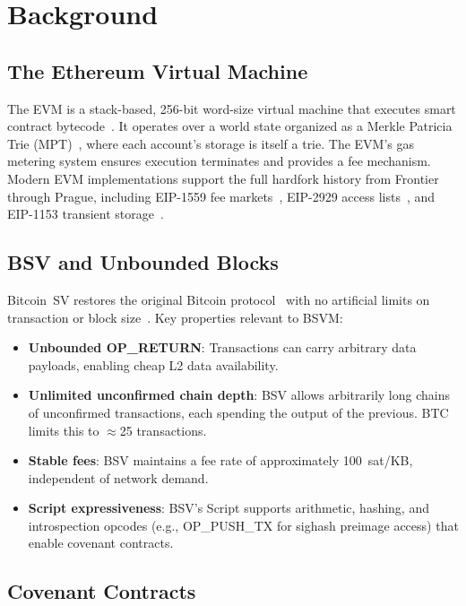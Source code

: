 \documentclass[11pt,twocolumn]{article}
\begin{document}
\section{Background}
\label{sec:background}

\subsection{The Ethereum Virtual Machine}

The EVM is a stack-based, 256-bit word-size virtual machine that executes smart contract bytecode~\cite{wood_ethereum}. It operates over a world state organized as a Merkle Patricia Trie (MPT)~\cite{wood_ethereum}, where each account's storage is itself a trie. The EVM's gas metering system ensures execution terminates and provides a fee mechanism. Modern EVM implementations support the full hardfork history from Frontier through Prague, including EIP-1559 fee markets~\cite{eip1559}, EIP-2929 access lists~\cite{eip2929}, and EIP-1153 transient storage~\cite{eip1153}.

\subsection{BSV and Unbounded Blocks}

Bitcoin~SV restores the original Bitcoin protocol~\cite{nakamoto} with no artificial limits on transaction or block size~\cite{bsv_scaling}. Key properties relevant to BSVM:

\begin{itemize}[nosep,leftmargin=1.5em]
\item \textbf{Unbounded OP\_RETURN}: Transactions can carry arbitrary data payloads, enabling cheap L2 data availability.
\item \textbf{Unlimited unconfirmed chain depth}: BSV allows arbitrarily long chains of unconfirmed transactions, each spending the output of the previous. BTC limits this to $\approx$25 transactions.
\item \textbf{Stable fees}: BSV maintains a fee rate of approximately 100~sat/KB, independent of network demand.
\item \textbf{Script expressiveness}: BSV's Script supports arithmetic, hashing, and introspection opcodes (e.g., OP\_PUSH\_TX for sighash preimage access) that enable covenant contracts.
\end{itemize}

\subsection{Covenant Contracts}
\end{document}
